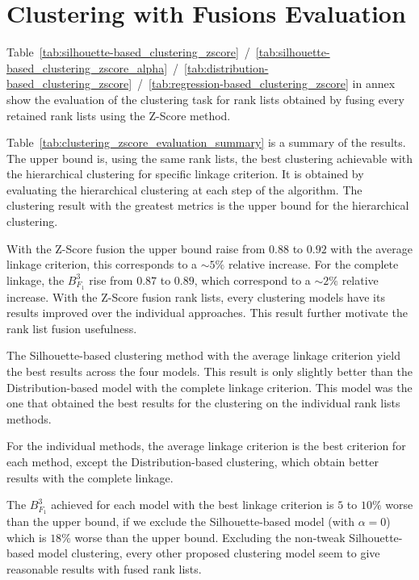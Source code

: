 \section{Clustering with Fusions Evaluation}

Table~\ref{tab:silhouette-based_clustering_zscore}~/~\ref{tab:silhouette-based_clustering_zscore_alpha}~/~\ref{tab:distribution-based_clustering_zscore}~/~\ref{tab:regression-based_clustering_zscore} in annex show the evaluation of the clustering task for rank lists obtained by fusing every retained rank lists using the Z-Score method.

Table~\ref{tab:clustering_zscore_evaluation_summary} is a summary of the results.
The upper bound is, using the same rank lists, the best clustering achievable with the hierarchical clustering for specific linkage criterion.
It is obtained by evaluating the hierarchical clustering at each step of the algorithm.
The clustering result with the greatest metrics is the upper bound for the hierarchical clustering.

With the Z-Score fusion the upper bound raise from $0.88$ to $0.92$ with the average linkage criterion, this corresponds to a $\sim 5\%$ relative increase.
For the complete linkage, the $B^{3}_{F_1}$ rise from $0.87$ to $0.89$, which correspond to a $\sim 2\%$ relative increase.
With the Z-Score fusion rank lists, every clustering models have its results improved over the individual approaches.
This result further motivate the rank list fusion usefulness.

The Silhouette-based clustering method with the average linkage criterion yield the best results across the four models.
This result is only slightly better than the Distribution-based model with the complete linkage criterion.
This model was the one that obtained the best results for the clustering on the individual rank lists methods.

For the individual methods, the average linkage criterion is the best criterion for each method, except the Distribution-based clustering, which obtain better results with the complete linkage.

The $B^{3}_{F_1}$ achieved for each model with the best linkage criterion is $5$ to $10\%$ worse than the upper bound, if we exclude the Silhouette-based model (with $\alpha = 0$) which is $18\%$ worse than the upper bound.
Excluding the non-tweak Silhouette-based model clustering, every other proposed clustering model seem to give reasonable results with fused rank lists.

